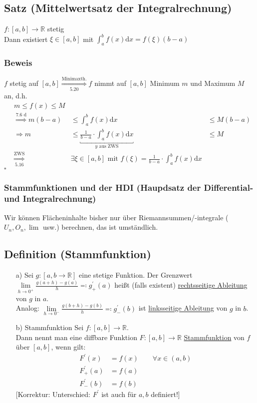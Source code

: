 \documentclass[12pt, titlepage]{article}
\newcommand{\R}{\mathds{R}}
\renewcommand{\>}{\rightarrow}
\renewcommand{\*}{\cdot}
\begin{document}
	\subsection{Satz (Mittelwertsatz der Integralrechnung)}
	$f\colon[a,b]\>\R$ stetig\\
	Dann existiert $\xi\in[a,b]$ mit $\int_{a}^{b}f(x)\textrm{d}x=f(\xi)(b-a)$\\
	\subsubsection*{Beweis}
	$f$ stetig auf $[a,b]\overset{\textrm{Minimaxth.}}{\underset{\textrm{5.20}}{\Rightarrow}}f$ nimmt auf $[a,b]$ Minimum $m$ und Maximum $M$ an, d.h.\\
	\begin{align*}
		&m\leq f(x)\leq M&&\\
		&\overset{\textrm{7.6 d}}{\Rightarrow}m(b-a)&\leq\int_{a}^{b}f(x)\textrm{d}x&\leq M(b-a)\\
		&\Rightarrow m&\leq\underbracket{\frac{1}{b-a}\*\int_{a}^{b}f(x)\textrm{d}x}_{y\textrm{ aus ZWS}}&\leq M\\
		&\overset{\textrm{ZWS}}{\underset{\textrm{5.16}}{\Rightarrow}}&\exists\xi\in[a,b]\textrm{ mit }f(\xi)=\frac{1}{b-a}\*\int_{a}^{b}f(x)\textrm{d}x&
	\end{align*}
	\hfill$\square$
	\subsubsection*{Stammfunktionen und der HDI (Haupdsatz der Differential- und Integralrechnung)}
	Wir können Flächeninhalte bisher nur über Riemannsummen/-integrale ($U_n,O_n,\lim$ usw.) berechnen, das ist umständlich.
	\subsection{Definition (Stammfunktion)}
	\begin{itemize}
		\item[a)] Sei $g\colon[a,b\>\R]$ eine stetige Funktion. Der Grenzwert $\lim\limits_{h\>0^+}\frac{g(a+h)-g(a)}{h}\eqqcolon g^\prime_+(a)$ heißt (falls existent) \underline{rechtsseitige Ableitung} von $g$ in $a$.\\
		Analog: $\lim\limits_{h\>0^-}\frac{g(b+h)-g(b)}{h}\eqqcolon g^\prime_-(b)$ ist \underline{linksseitige Ableitung} von $g$ in $b$.
		\item[b) Stammfunktion] Sei $f\colon[a,b]\>\R$.\\Dann nennt man eine diffbare Funktion $F\colon[a,b]\>\R$ \underline{Stammfunktion} von $f$ über $[a,b]$, wenn gilt:
		\begin{align*}
			F^\prime(x)&=f(x)\qquad\forall x\in(a,b)\\
			F^\prime_+(a)&=f(a)\\
			F^\prime_-(b)&=f(b)
		\end{align*}
		[Korrektur: Unterschied: $F^\prime$ ist auch für $a,b$ definiert!]
	\end{itemize}
\end{document}
